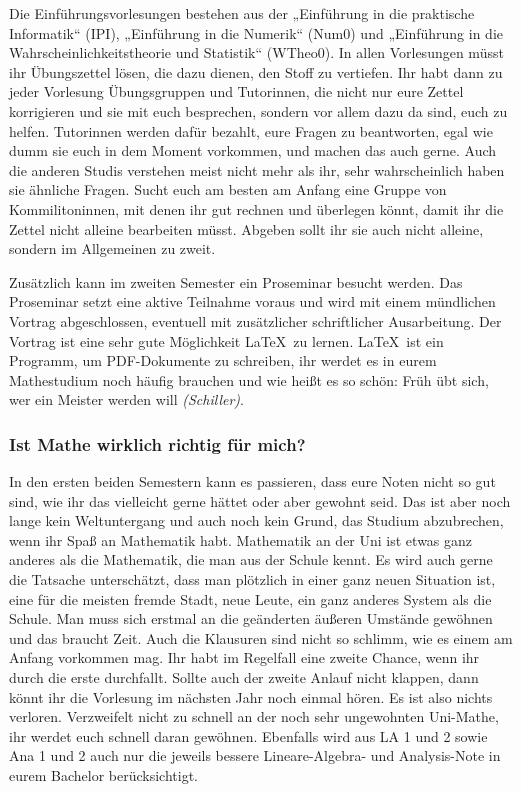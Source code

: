 Die Einführungsvorlesungen bestehen aus der „Einführung in die praktische Informatik“ (\gls{IPI}), „Einführung in die Numerik“ (\gls{Num0}) und „Einführung in die Wahrscheinlichkeitstheorie und Statistik“ (\gls{WTheo0}). In allen Vorlesungen müsst ihr Übungszettel lösen, die dazu dienen, den Stoff zu vertiefen. Ihr habt dann zu jeder Vorlesung Übungsgruppen und Tutorinnen, die nicht nur eure Zettel korrigieren und sie mit euch besprechen, sondern vor allem dazu da sind, euch zu helfen. Tutorinnen werden dafür bezahlt, eure Fragen zu beantworten, egal wie dumm sie euch in dem Moment vorkommen, und machen das auch gerne. Auch die anderen Studis verstehen meist nicht mehr als ihr, sehr wahrscheinlich haben sie ähnliche Fragen. Sucht euch am besten am Anfang eine Gruppe von Kommilitoninnen, mit denen ihr gut rechnen und überlegen könnt, damit ihr die Zettel nicht alleine bearbeiten müsst. Abgeben sollt ihr sie auch nicht alleine, sondern im Allgemeinen zu zweit.

Zusätzlich kann im zweiten Semester ein Proseminar besucht werden. Das Proseminar setzt eine aktive Teilnahme voraus und wird mit einem mündlichen Vortrag abgeschlossen, eventuell mit zusätzlicher schriftlicher Ausarbeitung. Der Vortrag ist eine sehr gute Möglichkeit \LaTeX\ zu lernen. \LaTeX\ ist ein Programm, um PDF-Dokumente zu schreiben, ihr werdet es in eurem Mathestudium noch häufig brauchen und wie heißt es so schön: Früh übt sich, wer ein Meister werden will \textit{(Schiller)}.

\subsubsection{Ist Mathe wirklich richtig für mich?}

In den ersten beiden Semestern kann es passieren, dass eure Noten nicht so gut sind, wie ihr das vielleicht gerne hättet oder aber gewohnt seid. Das ist aber noch lange kein Weltuntergang und auch noch kein Grund, das Studium abzubrechen, wenn ihr Spaß an Mathematik habt. Mathematik an der Uni ist etwas ganz anderes als die Mathematik, die man aus der Schule kennt. Es wird auch gerne die Tatsache unterschätzt, dass man plötzlich in einer ganz neuen Situation ist, eine für die meisten fremde Stadt, neue Leute, ein ganz anderes System als die Schule. Man muss sich erstmal an die geänderten äußeren Umstände gewöhnen und das braucht Zeit. Auch die Klausuren sind nicht so schlimm, wie es einem am Anfang vorkommen mag. Ihr habt im Regelfall eine zweite Chance, wenn ihr durch die erste durchfallt. Sollte auch der zweite Anlauf nicht klappen, dann könnt ihr die Vorlesung im nächsten Jahr noch einmal hören. Es ist also nichts verloren. Verzweifelt nicht zu schnell an der noch sehr ungewohnten Uni-Mathe, ihr werdet euch schnell daran gewöhnen. Ebenfalls wird aus LA 1 und 2 sowie Ana 1 und 2 auch nur die jeweils bessere Lineare-Algebra- und Analysis-Note in eurem Bachelor berücksichtigt.


